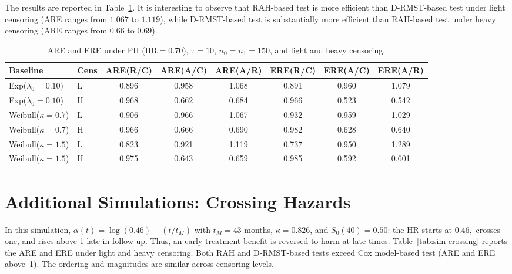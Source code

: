 \documentclass[12pt]{article}
\begin{document}
The results are reported in Table~\ref{tab:sim-tau10}. It is interesting to observe that
RAH-based test is more efficient than D-RMST-based test
under light censoring (ARE ranges from $1.067$ to $1.119$),
while D-RMST-based test is substantially more efficient than RAH-based test
under heavy censoring (ARE ranges from $0.66$ to $0.69$).

\begin{table}[h!]
\centering
\small
\caption{ARE and ERE under PH (HR$=0.70$), $\tau=10$,
  $n_0=n_1=150$, and light and heavy censoring.
  }
\label{tab:sim-tau10}
\setlength{\tabcolsep}{4pt}
\begin{tabular}{llcccccc}
\hline
Baseline & Cens & ARE(R/C) & ARE(A/C) & ARE(A/R) & ERE(R/C) & ERE(A/C) & ERE(A/R) \\
\hline
Exp($\lambda_0{=}0.10$)      & L & 0.896 & 0.958 & 1.068 & 0.891 & 0.960 & 1.079 \\
Exp($\lambda_0{=}0.10$)      & H & 0.968 & 0.662 & 0.684 & 0.966 & 0.523 & 0.542 \\
Weibull($\kappa{=}0.7$)      & L & 0.906 & 0.966 & 1.067 & 0.932 & 0.959 & 1.029 \\
Weibull($\kappa{=}0.7$)      & H & 0.966 & 0.666 & 0.690 & 0.982 & 0.628 & 0.640 \\
Weibull($\kappa{=}1.5$)      & L & 0.823 & 0.921 & 1.119 & 0.737 & 0.950 & 1.289 \\
Weibull($\kappa{=}1.5$)      & H & 0.975 & 0.643 & 0.659 & 0.985 & 0.592 & 0.601 \\
\hline
\end{tabular}
\end{table}

\section{Additional Simulations: Crossing Hazards}
\label{sec:appendix-crossing}



In this simulation, $\alpha(t)=\log(0.46)+(t/t_M)$ with $t_M=43$ months,
$\kappa=0.826$, and $S_0(40)=0.50$: the HR starts at $0.46,$ crosses one, and rises above 1 late in follow-up. Thus, an early treatment benefit is reversed to harm at late times.
Table~\ref{tab:sim-crossing} reports the ARE and ERE under light and heavy censoring. Both RAH and D-RMST-based tests exceed Cox model-based test (ARE and ERE above~1). The ordering and magnitudes are similar across censoring levels.
\end{document}
